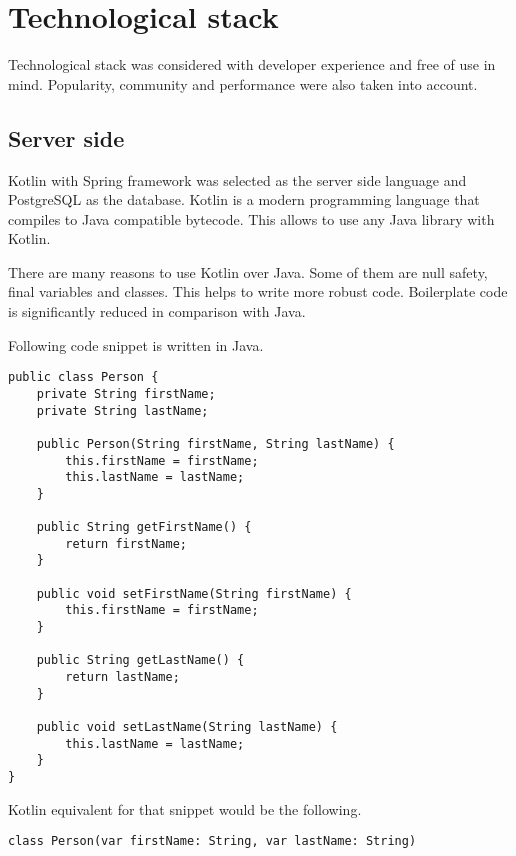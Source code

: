
\section{Technological stack}\label{sec:technological-stack}

Technological stack was considered with developer experience and free of use in mind.
Popularity, community and performance were also taken into account.

\subsection{Server side}\label{subsec:ts-server-side}

Kotlin with Spring framework was selected as the server side language and PostgreSQL as the database.\cite{kotlin, spring, postgresql}
Kotlin is a modern programming language that compiles to Java compatible bytecode.
This allows to use any Java library with Kotlin.

There are many reasons to use Kotlin over Java.
Some of them are null safety, final variables and classes.
This helps to write more robust code.
Boilerplate code is significantly reduced in comparison with Java.

Following code snippet is written in Java.\\

\begin{Verbatim}[frame=single]
public class Person {
    private String firstName;
    private String lastName;

    public Person(String firstName, String lastName) {
        this.firstName = firstName;
        this.lastName = lastName;
    }

    public String getFirstName() {
        return firstName;
    }

    public void setFirstName(String firstName) {
        this.firstName = firstName;
    }

    public String getLastName() {
        return lastName;
    }

    public void setLastName(String lastName) {
        this.lastName = lastName;
    }
}
\end{Verbatim}

Kotlin equivalent for that snippet would be the following.\\
\begin{Verbatim}[frame=single]
class Person(var firstName: String, var lastName: String)
\end{Verbatim}

